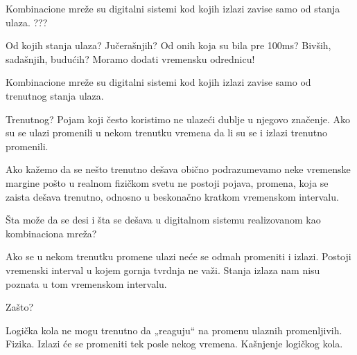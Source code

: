 \begin{frame}[label=02-s002]
\gusttekst
Kombinacione mreže su digitalni sistemi kod kojih izlazi zavise samo od stanja ulaza. ???

Od kojih stanja ulaza? Jučerašnjih? Od onih koja su bila pre 100ms? Bivših, sadašnjih, budućih?
Moramo dodati vremensku odrednicu!

Kombinacione mreže su digitalni sistemi kod kojih izlazi zavise samo od \alert{trenutnog} stanja ulaza.

Trenutnog? Pojam koji često koristimo ne ulazeći dublje u njegovo značenje.
Ako su se ulazi promenili u nekom trenutku vremena da li su se i izlazi \alert{trenutno} promenili.

Ako kažemo da se nešto trenutno dešava obično podrazumevamo neke vremenske margine pošto u realnom fizičkom svetu ne postoji pojava, promena, koja se zaista dešava trenutno, odnosno u beskonačno kratkom vremenskom intervalu.

Šta može da se desi i šta se dešava u digitalnom sistemu realizovanom kao kombinaciona mreža?

\alert{Ako se u nekom trenutku promene ulazi neće se odmah promeniti i izlazi. Postoji vremenski interval u kojem gornja tvrdnja ne važi. Stanja izlaza nam nisu poznata u tom vremenskom intervalu.}

Zašto?

Logička kola ne mogu trenutno da „reaguju“ na promenu ulaznih promenljivih. Fizika. Izlazi će se promeniti tek posle nekog vremena. \alert{Kašnjenje logičkog kola.}
\end{frame}
